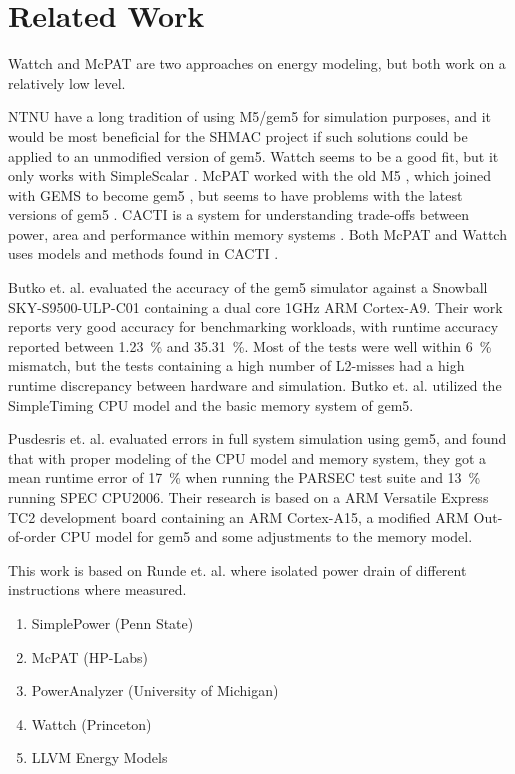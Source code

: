 \section{Related Work}

Wattch \cite{brooks2000wattch} and McPAT \cite{hpmcpat,li2013mcpat} are two
approaches on energy modeling, but both work on a relatively low level.

NTNU have a long tradition of using M5/gem5 for simulation purposes, and it
would be most beneficial for the SHMAC project if such solutions could be
applied to an unmodified version of gem5. Wattch seems to be a good fit, but it
only works with SimpleScalar \cite{wattchanalysis}. McPAT worked with the old M5
\cite{m5mcpatparser}, which joined with GEMS to become gem5 \cite{gem5hipeac},
but seems to have problems with the latest versions of gem5
\cite{mcpatgem5problems}. CACTI is a system for understanding trade-offs between
power, area and performance within memory systems
\cite{hpcacti,muralimanohar2010memory}. Both McPAT and Wattch uses models and
methods found in CACTI \cite{li2009mcpat}.



Butko et. al. \cite{butko2012accuracy} evaluated the accuracy of the gem5
simulator against a Snowball SKY-S9500-ULP-C01 containing a dual core 1GHz ARM
Cortex-A9.  Their work reports very good accuracy for benchmarking workloads,
with runtime accuracy reported between 1.23~\% and 35.31~\%.  Most of the tests
were well within 6~\% mismatch, but the tests containing a high number of
L2-misses had a high runtime discrepancy between hardware and simulation. Butko et. al.
utilized the SimpleTiming CPU model and the basic memory system of gem5.

Pusdesris et. al. \cite{pusdesrissources} evaluated errors in full system
simulation using gem5, and found that with proper modeling of the CPU model
and memory system, they got a mean runtime error of 17~\% when running the PARSEC
test suite and 13~\% running SPEC CPU2006. Their research is based on a ARM
Versatile Express TC2 development board containing an ARM Cortex-A15, a modified
ARM Out-of-order CPU model for gem5 and some adjustments to the memory model.

This work is based on Runde et. al. \cite{rundehvatum2013exploring} where isolated
power drain of different instructions where measured.

\begin{enumerate}
    \item SimplePower (Penn State)
    \item McPAT (HP-Labs)
    \item PowerAnalyzer (University of Michigan)
    \item Wattch (Princeton)
    \item LLVM Energy Models
\end{enumerate}
